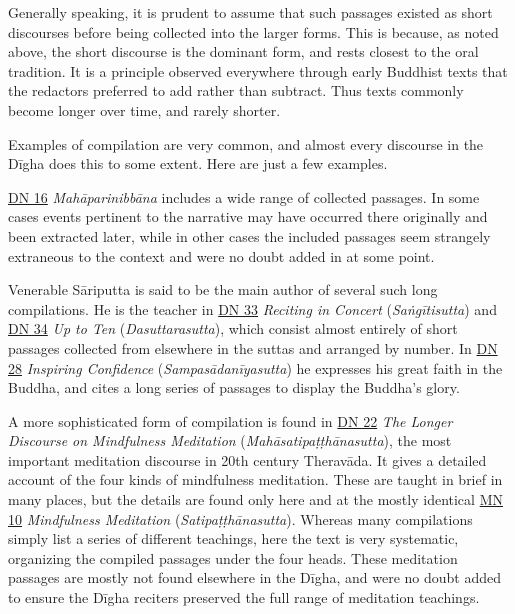 \documentclass[12pt,openany]{book}%
\begin{document}
Generally speaking, it is prudent to assume that such passages existed as short discourses before being collected into the larger forms. This is because, as noted above, the short discourse is the dominant form, and rests closest to the oral tradition. It is a principle observed everywhere through early Buddhist texts that the redactors preferred to add rather than subtract. Thus texts commonly become longer over time, and rarely shorter.

Examples of compilation are very common, and almost every discourse in the \textsanskrit{Dīgha} does this to some extent. Here are just a few examples.

\href{https://suttacentral.net/dn16}{DN 16} \textit{\textsanskrit{Mahāparinibbāna}} includes a wide range of collected passages. In some cases events pertinent to the narrative may have occurred there originally and been extracted later, while in other cases the included passages seem strangely extraneous to the context and were no doubt added in at some point.

Venerable \textsanskrit{Sāriputta} is said to be the main author of several such long compilations. He is the teacher in \href{https://suttacentral.net/dn33}{DN 33} \textit{Reciting in Concert} (\textit{\textsanskrit{Saṅgītisutta}}) and \href{https://suttacentral.net/dn34}{DN 34} \textit{Up to Ten} (\textit{Dasuttarasutta}), which consist almost entirely of short passages collected from elsewhere in the suttas and arranged by number. In \href{https://suttacentral.net/dn28}{DN 28} \textit{Inspiring Confidence} (\textit{\textsanskrit{Sampasādanīyasutta}}) he expresses his great faith in the Buddha, and cites a long series of passages to display the Buddha’s glory.

A more sophisticated form of compilation is found in \href{https://suttacentral.net/dn22}{DN 22} \textit{The Longer Discourse on Mindfulness Meditation} (\textit{\textsanskrit{Mahāsatipaṭṭhānasutta}}), the most important meditation discourse in 20th century \textsanskrit{Theravāda}. It gives a detailed account of the four kinds of mindfulness meditation. These are taught in brief in many places, but the details are found only here and at the mostly identical \href{https://suttacentral.net/mn10}{MN 10} \textit{Mindfulness Meditation} (\textit{\textsanskrit{Satipaṭṭhānasutta}}). Whereas many compilations simply list a series of different teachings, here the text is very systematic, organizing the compiled passages under the four heads. These meditation passages are mostly not found elsewhere in the \textsanskrit{Dīgha}, and were no doubt added to ensure the \textsanskrit{Dīgha} reciters preserved the full range of meditation teachings.
\end{document}
